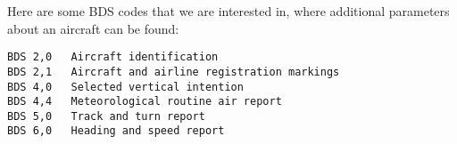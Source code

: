 Here are some BDS codes that we are interested in, where additional
parameters about an aircraft can be found:

\begin{verbatim}
BDS 2,0   Aircraft identification
BDS 2,1   Aircraft and airline registration markings
BDS 4,0   Selected vertical intention
BDS 4,4   Meteorological routine air report
BDS 5,0   Track and turn report
BDS 6,0   Heading and speed report
\end{verbatim}
